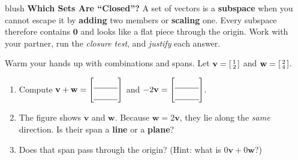 \documentclass[10pt]{article}
\newcommand{\vv}{\mathbf{v}}
\newcommand{\ww}{\mathbf{w}}
\newcommand{\zero}{\mathbf{0}}
\begin{document}
\namepartnerperiod

\vspace{0.10in}

\begin{headlinebox}{blush}
\small\textbf{Which Sets Are ``Closed''?} A set of vectors is a \textbf{subspace} when you cannot
escape it by \textbf{adding} two members or \textbf{scaling} one. Every subspace therefore
contains $\zero$ and looks like a flat piece through the origin. Work with your partner, run the
\emph{closure test}, and \emph{justify} each answer.
\end{headlinebox}

\vspace{0.10in}

\begin{tcolorbox}[colback=white, colframe=black!40, title=\textbf{Tier R --- Remediate},
    fonttitle=\bfseries, arc=1.5mm, left=3mm, right=3mm, top=2mm, bottom=2mm, breakable]
Warm your hands up with combinations and spans. Let
$\vv=\begin{bsmallmatrix} 1\\2 \end{bsmallmatrix}$ and $\ww=\begin{bsmallmatrix} 2\\4 \end{bsmallmatrix}$.
\begin{enumerate}[leftmargin=1.7em, itemsep=8pt]
  \item Compute $\vv+\ww=\begin{bmatrix}\rule{0pt}{1.0em}\blank{1.0cm}\\[2pt]\blank{1.0cm}\end{bmatrix}$
        \qquad and \qquad
        $-2\vv=\begin{bmatrix}\rule{0pt}{1.0em}\blank{1.0cm}\\[2pt]\blank{1.0cm}\end{bmatrix}$.
  \item The figure shows $\vv$ and $\ww$. Because $\ww=2\vv$, they lie along the \emph{same}
        direction. Is their span a \textbf{line} or a \textbf{plane}? \; \blank{2.6cm}
        \begin{center}
        \end{center}
  \item Does that span pass through the origin? \; \blank{2.0cm} \quad
        (Hint: what is $0\vv+0\ww$?)
\end{enumerate}
\end{tcolorbox}
\end{document}
